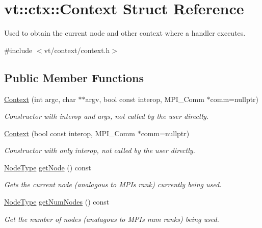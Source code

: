 \hypertarget{structvt_1_1ctx_1_1_context}{}\section{vt\+:\+:ctx\+:\+:Context Struct Reference}
\label{structvt_1_1ctx_1_1_context}


Used to obtain the current node and other context where a handler executes.  




{\ttfamily \#include $<$vt/context/context.\+h$>$}

\subsection*{Public Member Functions}
\begin{DoxyCompactItemize}
\item 
\hyperlink{structvt_1_1ctx_1_1_context_a860016b34ca68006a733314f970216b8}{Context} (int argc, char $\ast$$\ast$argv, bool const interop, M\+P\+I\+\_\+\+Comm $\ast$comm=nullptr)
\begin{DoxyCompactList}\small\item\em Constructor with interop and args, not called by the user directly. \end{DoxyCompactList}\item 
\hyperlink{structvt_1_1ctx_1_1_context_a9f5b0fcad61a79f18fdaf7d757b52b6a}{Context} (bool const interop, M\+P\+I\+\_\+\+Comm $\ast$comm=nullptr)
\begin{DoxyCompactList}\small\item\em Constructor with only interop, not called by the user directly. \end{DoxyCompactList}\item 
\hyperlink{namespacevt_a866da9d0efc19c0a1ce79e9e492f47e2}{Node\+Type} \hyperlink{structvt_1_1ctx_1_1_context_a0d52c263ce8516546a67443d9a86fa5f}{get\+Node} () const
\begin{DoxyCompactList}\small\item\em Gets the current node (analagous to M\+PI\textquotesingle{}s rank) currently being used. \end{DoxyCompactList}\item 
\hyperlink{namespacevt_a866da9d0efc19c0a1ce79e9e492f47e2}{Node\+Type} \hyperlink{structvt_1_1ctx_1_1_context_a7f41071aadf6d5fa9e1b6c703c5ff19d}{get\+Num\+Nodes} () const
\begin{DoxyCompactList}\small\item\em Get the number of nodes (analagous to M\+PI\textquotesingle{}s num ranks) being used. \end{DoxyCompactList}\item 
$$
\end{DoxyCompactItemize}
